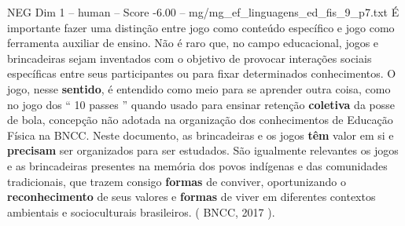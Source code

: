 \begin{textsample}{NEG Dim 1 – human – Score -6.00 – mg/mg\_ef\_linguagens\_ed\_fis\_9\_p7.txt}  \label{ex:f1_neg_011}
É importante fazer uma distinção entre jogo como conteúdo específico e jogo como ferramenta auxiliar de ensino.
Não é raro que, no campo educacional, jogos e brincadeiras sejam inventados com o objetivo de provocar interações sociais específicas entre seus participantes ou para fixar determinados conhecimentos.
O jogo, nesse \textbf{sentido}, é entendido como meio para se aprender outra coisa, como no jogo dos “ 10 passes ” quando usado para ensinar retenção \textbf{coletiva} da posse de bola, concepção não adotada na organização dos conhecimentos de Educação Física na BNCC.
Neste documento, as brincadeiras e os jogos \textbf{têm} valor em si e \textbf{precisam} ser organizados para ser estudados.
São igualmente relevantes os jogos e as brincadeiras presentes na memória dos povos indígenas e das comunidades tradicionais, que trazem consigo \textbf{formas} de conviver, oportunizando o \textbf{reconhecimento} de seus valores e \textbf{formas} de viver em diferentes contextos ambientais e socioculturais brasileiros. ( BNCC, 2017 ).

\end{textsample}
